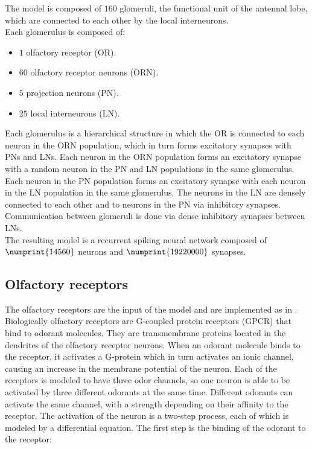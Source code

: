   The model is composed of $160$ glomeruli, the functional unit of the antennal lobe, which are connected to each other by the local interneurons.\\
  Each glomerulus is composed of:

  \begin{multicols}{2}
    \begin{itemize}
      \item $1$ olfactory receptor (OR).
      \item $60$ olfactory receptor neurons (ORN).
      \item $5$ projection neurons (PN).
      \item $25$ local interneurons (LN).
    \end{itemize}
  \end{multicols}

  Each glomerulus is a hierarchical structure in which the OR is connected to each neuron in the ORN population, which in turn forms excitatory synapses with PNs and LNs.
  Each neuron in the ORN population forms an excitatory synapse with a random neuron in the PN and LN populations in the same glomerulus.
  Each neuron in the PN population forms an excitatory synapse with each neuron in the LN population in the same glomerulus.
  The neurons in the LN are densely connected to each other and to neurons in the PN via inhibitory synapses.
  Communication between glomeruli is done via dense inhibitory synapses between LNs.\\
  The resulting model is a recurrent spiking neural network composed of $\numprint{14560}$ neurons and $\numprint{19220000}$ synapses.

  \subsection{Olfactory receptors}
  The olfactory receptors are the input of the model and are implemented as in \cite{bee-geosmin}.
  Biologically olfactory receptors are G-coupled protein receptors (GPCR) that bind to odorant molecules.
  They are transmembrane proteins located in the dendrites of the olfactory receptor neurons.
  When an odorant molecule binds to the receptor, it activates a G-protein which in turn activates an ionic channel, causing an increase in the membrane potential of the neuron.
  Each of the receptors is modeled to have three odor channels, so one neuron is able to be activated by three different odorants at the same time.
  Different odorants can activate the same channel, with a strength depending on their affinity to the receptor.
  The activation of the neuron is a two-step process, each of which is modeled by a differential equation.
  The first step is the binding of the odorant to the receptor:


